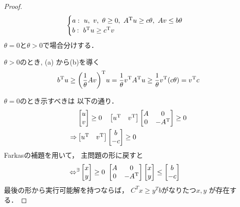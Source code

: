 \begin{proof}
\begin{equation*}
  \begin{cases}
    a:\ u,\ v,\ \theta\geq 0,\ {A}^{\mathrm{T}}u\geq c\theta ,\ Av\leq b\theta\\
    b:\ {b}^{\mathrm{T}}u\geq{c}^{\mathrm{T}}v
  \end{cases}
\end{equation*}
$\theta =0$と$\theta >0$で場合分けする．

$\theta >0$のとき,
(a) から(b)を導く
\begin{equation}
  {b}^{\mathrm{T}}u\geq {\left( \displaystyle\frac{1}{\theta}Av\right)}^{\mathrm{T}}u=\frac{1}{\theta}{v}^{\mathrm{T}}{A}^{\mathrm{T}}u\geq\frac{1}{\theta}{v}^{\mathrm{T}}(c\theta )={v}^{\mathrm{T}}c
\end{equation}

$\theta =0$のとき示すべきは
以下の通り．\\
\begin{align}
  &
  \begin{bmatrix}
  u\\v
  \end{bmatrix}\geq 0
  \quad 
  \begin{bmatrix}
    {u}^{\mathrm{T}}&{v}^{\mathrm{T}}
  \end{bmatrix}
  \begin{bmatrix}
    A&0\\
    0&-{A}^{\mathrm{T}}
  \end{bmatrix}\geq 0\\
  \Rightarrow &\begin{bmatrix}
    {u}^{\mathrm{T}}&{v}^{\mathrm{T}}
  \end{bmatrix}
  \begin{bmatrix}
    b\\
    -c
  \end{bmatrix}\geq 0
  \end{align}
  Farkasの補題を用いて，
主問題の形に戻すと
  \begin{align}
  \Leftrightarrow &{}^{\exists}\begin{bmatrix}
    x\\
    y
\end{bmatrix}\geq 0\
\begin{bmatrix}
  A&0\\
  0&-{A}^{\mathrm{T}}
\end{bmatrix}
\begin{bmatrix}
  x\\
  y
\end{bmatrix}\leq
\begin{bmatrix}
  b\\
  -c
\end{bmatrix}
\end{align}
最後の形から実行可能解を持つならば，
$C^Tx \geq y^Tb$がなりたつ$x,y$
が存在する．

\end{proof}